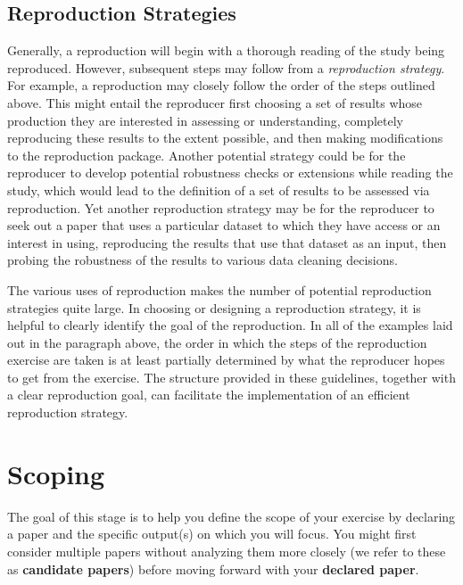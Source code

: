 \documentclass[]{book}
\begin{document}
\hypertarget{reproduction-strategies}{%
\section*{Reproduction Strategies}\label{reproduction-strategies}}

Generally, a reproduction will begin with a thorough reading of the study being reproduced. However, subsequent steps may follow from a \emph{reproduction strategy}. For example, a reproduction may closely follow the order of the steps outlined above. This might entail the reproducer first choosing a set of results whose production they are interested in assessing or understanding, completely reproducing these results to the extent possible, and then making modifications to the reproduction package. Another potential strategy could be for the reproducer to develop potential robustness checks or extensions while reading the study, which would lead to the definition of a set of results to be assessed via reproduction. Yet another reproduction strategy may be for the reproducer to seek out a paper that uses a particular dataset to which they have access or an interest in using, reproducing the results that use that dataset as an input, then probing the robustness of the results to various data cleaning decisions.

The various uses of reproduction makes the number of potential reproduction strategies quite large. In choosing or designing a reproduction strategy, it is helpful to clearly identify the goal of the reproduction. In all of the examples laid out in the paragraph above, the order in which the steps of the reproduction exercise are taken is at least partially determined by what the reproducer hopes to get from the exercise. The structure provided in these guidelines, together with a clear reproduction goal, can facilitate the implementation of an efficient reproduction strategy.

\hypertarget{scoping}{%
\chapter{Scoping}\label{scoping}}

The goal of this stage is to help you define the scope of your exercise by declaring a paper and the specific output(s) on which you will focus. You might first consider multiple papers without analyzing them more closely (we refer to these as \textbf{candidate papers}) before moving forward with your \textbf{declared paper}.
\end{document}
